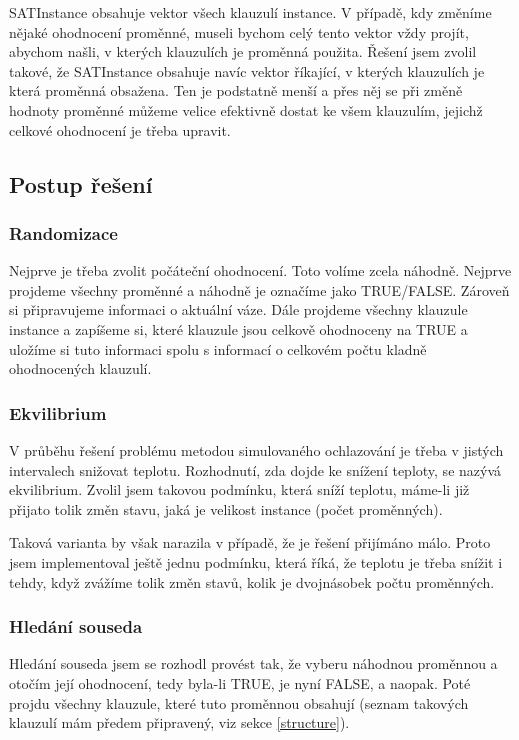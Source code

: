 \documentclass[12pt,a4paper]{article}
\begin{document}
SATInstance obsahuje vektor všech klauzulí instance. V případě, kdy změníme nějaké ohodnocení proměnné, museli bychom celý tento vektor vždy projít, abychom našli, v kterých klauzulích je proměnná použita. Řešení jsem zvolil takové, že SATInstance obsahuje navíc vektor říkající, v kterých klauzulích je která proměnná obsažena. Ten je podstatně menší a přes něj se při změně hodnoty proměnné můžeme velice efektivně dostat ke všem klauzulím, jejichž celkové ohodnocení je třeba upravit.

\subsection{Postup řešení}

\subsubsection{Randomizace}

Nejprve je třeba zvolit počáteční ohodnocení. Toto volíme zcela náhodně. Nejprve projdeme všechny proměnné a náhodně je označíme jako TRUE/FALSE. Zároveň si připravujeme informaci o aktuální váze. Dále projdeme všechny klauzule instance a zapíšeme si, které klauzule jsou celkově ohodnoceny na TRUE a uložíme si tuto informaci spolu s informací o celkovém počtu kladně ohodnocených klauzulí.

\subsubsection{Ekvilibrium}

V průběhu řešení problému metodou simulovaného ochlazování je třeba v jistých intervalech snižovat teplotu. Rozhodnutí, zda dojde ke snížení teploty, se nazývá ekvilibrium. Zvolil jsem takovou podmínku, která sníží teplotu, máme-li již přijato tolik změn stavu, jaká je velikost instance (počet proměnných). 

Taková varianta by však narazila v případě, že je řešení přijímáno málo. Proto jsem implementoval ještě jednu podmínku, která říká, že teplotu je třeba snížit i tehdy, když zvážíme tolik změn stavů, kolik je dvojnásobek počtu proměnných.

\subsubsection{Hledání souseda}

Hledání souseda jsem se rozhodl provést tak, že vyberu náhodnou proměnnou a otočím její ohodnocení, tedy byla-li TRUE, je nyní FALSE, a naopak. Poté projdu všechny klauzule, které tuto proměnnou obsahují (seznam takových klauzulí mám předem připravený, viz sekce \ref{structure}).
\end{document}
